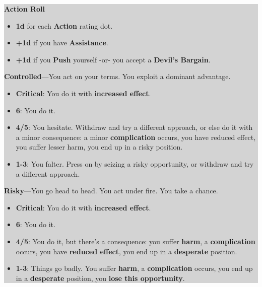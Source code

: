 {\setlength\fboxsep{1em}
\colorbox{lightgray}{\begin{minipage}{\linewidth}
\begin{LARGE}\textbf{Action Roll}\end{LARGE}

\begin{itemize}
\item    \textbf{1d} for each \textbf{Action} rating dot.
\item    \textbf{+1d} if you have \textbf{Assistance}.
\item    \textbf{+1d} if you \textbf{Push} yourself -or- you accept a \textbf{Devil’s Bargain}.
\end{itemize}

\textbf{Controlled}---You act on your terms. You exploit a dominant advantage.

\begin{itemize}
\item    \textbf{Critical}: You do it with \textbf{increased effect}.
\item    \textbf{6}: You do it.
\item    \textbf{4/5}: You hesitate. Withdraw and try a different approach, or else do it with a minor consequence: a minor \textbf{complication} occurs, you have reduced effect, you suffer lesser harm, you end up in a risky position.
\item    \textbf{1-3}: You falter. Press on by seizing a risky opportunity, or withdraw and try a different approach.
\end{itemize}

\textbf{Risky}---You go head to head. You act under fire. You take a chance.

\begin{itemize}
\item    \textbf{Critical}: You do it with \textbf{increased effect}.
\item    \textbf{6}: You do it.
\item    \textbf{4/5}: You do it, but there’s a consequence: you suffer \textbf{harm}, a \textbf{complication} occurs, you have \textbf{reduced effect}, you end up in a \textbf{desperate} position.
\item    \textbf{1-3}: Things go badly. You suffer \textbf{harm}, a \textbf{complication} occurs, you end up in a \textbf{desperate} position, you \textbf{lose this opportunity}.
\end{itemize}


\end{minipage}}}
